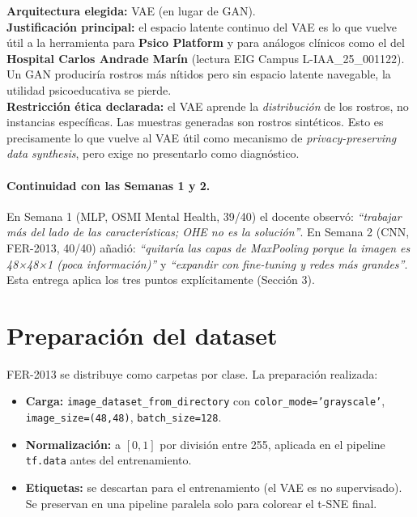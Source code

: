 \documentclass[10pt,a4paper,twocolumn]{article}
\begin{document}
\textbf{Arquitectura elegida:} VAE (en lugar de GAN).\\
\textbf{Justificación principal:} el espacio latente continuo del VAE es lo que vuelve útil a la herramienta para \textbf{Psico Platform} y para análogos clínicos como el del \textbf{Hospital Carlos Andrade Marín} (lectura EIG Campus L-IAA\_25\_001122). Un GAN produciría rostros más nítidos pero sin espacio latente navegable, la utilidad psicoeducativa se pierde.\\
\textbf{Restricción ética declarada:} el VAE aprende la \textit{distribución} de los rostros, no instancias específicas. Las muestras generadas son rostros sintéticos. Esto es precisamente lo que vuelve al VAE útil como mecanismo de \textit{privacy-preserving data synthesis}, pero exige no presentarlo como diagnóstico.

\paragraph{Continuidad con las Semanas 1 y 2.} En Semana 1 (MLP, OSMI Mental Health, 39/40) el docente observó: \textit{``trabajar más del lado de las características; OHE no es la solución''}. En Semana 2 (CNN, FER-2013, 40/40) añadió: \textit{``quitaría las capas de MaxPooling porque la imagen es 48×48×1 (poca información)''} y \textit{``expandir con fine-tuning y redes más grandes''}. Esta entrega aplica los tres puntos explícitamente (Sección 3).

\section{Preparación del dataset}

FER-2013 se distribuye como carpetas por clase. La preparación realizada:

\begin{itemize}
    \item \textbf{Carga:} \texttt{image\_dataset\_from\_directory} con \texttt{color\_mode='grayscale'}, \texttt{image\_size=(48,48)}, \texttt{batch\_size=128}.
    \item \textbf{Normalización:} a $[0, 1]$ por división entre 255, aplicada en el pipeline \texttt{tf.data} antes del entrenamiento.
    \item \textbf{Etiquetas:} se descartan para el entrenamiento (el VAE es no supervisado). Se preservan en una pipeline paralela solo para colorear el t-SNE final.
\end{itemize}
\end{document}
